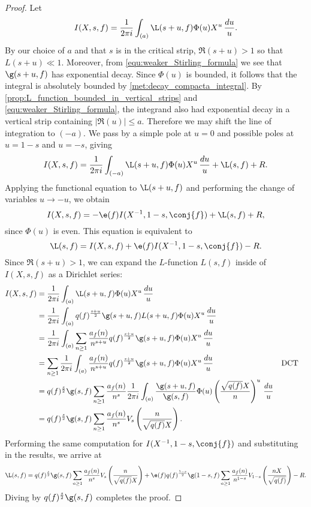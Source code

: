     \begin{proof}
      Let
      \[
        I(X,s,f) = \frac{1}{2\pi i}\int_{(a)}\L(s+u,f)\Phi(u)X^{u}\,\frac{du}{u}.
      \]
      By our choice of $a$ and that $s$ is in the critical strip, $\Re(s+u) > 1$ so that $L(s+u) \ll 1$. Moreover, from \cref{equ:weaker_Stirling_formula} we see that $\g(s+u,f)$ has exponential decay. Since $\Phi(u)$ is bounded, it follows that the integral is absolutely bounded by \cref{met:decay_compacta_integral}. By \cref{prop:L_function_bounded_in_vertical_strips} and \cref{equ:weaker_Stirling_formula}, the integrand also had exponential decay in a vertical strip containing $|\Re(u)| \le a$. Therefore we may shift the line of integration to $(-a)$. We pass by a simple pole at $u = 0$ and possible poles at $u = 1-s$ and $u = -s$, giving
      \[
        I(X,s,f) = \frac{1}{2\pi i}\int_{(-a)}\L(s+u,f)\Phi(u)X^{u}\,\frac{du}{u}+\L(s,f)+R.
      \]
      Applying the functional equation to $\L(s+u,f)$ and performing the change of variables $u \to -u$, we obtain
      \[
        I(X,s,f) = -\e(f)I(X^{-1},1-s,\conj{f})+\L(s,f)+R,
      \]
      since $\Phi(u)$ is even. This equation is equivalent to
      \[
        \L(s,f) = I(X,s,f)+\e(f)I(X^{-1},1-s,\conj{f})-R.
      \]
      Since $\Re(s+u) > 1$, we can expand the $L$-function $L(s,f)$ inside of $I(X,s,f)$ as a Dirichlet series:
      \begin{align*}
        I(X,s,f) &= \frac{1}{2\pi i}\int_{(a)}\L(s+u,f)\Phi(u)X^{u}\,\frac{du}{u} \\
        &= \frac{1}{2\pi i}\int_{(a)}q(f)^{\frac{s+u}{2}}\g(s+u,f)L(s+u,f)\Phi(u)X^{u}\,\frac{du}{u} \\
        &= \frac{1}{2\pi i}\int_{(a)}\sum_{n \ge 1}\frac{a_{f}(n)}{n^{s+u}}q(f)^{\frac{s+u}{2}}\g(s+u,f)\Phi(u)X^{u}\,\frac{du}{u} \\
        &= \sum_{n \ge 1}\frac{1}{2\pi i}\int_{(a)}\frac{a_{f}(n)}{n^{s+u}}q(f)^{\frac{s+u}{2}}\g(s+u,f)\Phi(u)X^{u}\,\frac{du}{u} && \text{DCT} \\
        &= q(f)^{\frac{s}{2}}\g(s,f)\sum_{n \ge 1}\frac{a_{f}(n)}{n^{s}}\frac{1}{2\pi i}\int_{(a)}\frac{\g(s+u,f)}{\g(s,f)}\Phi(u)\left(\frac{\sqrt{q(f)}X}{n}\right)^{u}\,\frac{du}{u} \\
        &= q(f)^{\frac{s}{2}}\g(s,f)\sum_{n \ge 1}\frac{a_{f}(n)}{n^{s}}V_{s}\left(\frac{n}{\sqrt{q(f)}X}\right).
      \end{align*}
      Performing the same computation for $I(X^{-1},1-s,\conj{f})$ and substituting in the results, we arrive at
      \[
        \L(s,f) = q(f)^{\frac{s}{2}}\g(s,f)\sum_{n \ge 1}\frac{a_{f}(n)}{n^{s}}V_{s}\left(\frac{n}{\sqrt{q(f)}X}\right)+\e(f)q(f)^{\frac{1-s}{2}}\g(1-s,f)\sum_{n \ge 1}\frac{a_{f}(n)}{n^{1-s}}V_{1-s}\left(\frac{nX}{\sqrt{q(f)}}\right)-R.
      \]
      Diving by $q(f)^{\frac{s}{2}}\g(s,f)$ completes the proof.
    \end{proof}


